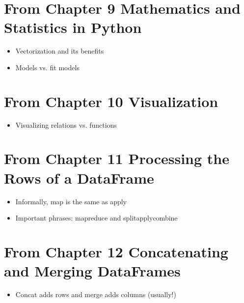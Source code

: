 \documentclass[letterpaper,10pt,english]{jupyterBook}
\begin{document}
\section{From Chapter 9 \sphinxhyphen{} Mathematics and Statistics in Python}
\label{\detokenize{bigpic-list:from-chapter-9-mathematics-and-statistics-in-python}}\begin{itemize}
\item {} 
\sphinxAtStartPar
Vectorization and its benefits

\item {} 
\sphinxAtStartPar
Models vs. fit models

\end{itemize}


\section{From Chapter 10 \sphinxhyphen{} Visualization}
\label{\detokenize{bigpic-list:from-chapter-10-visualization}}\begin{itemize}
\item {} 
\sphinxAtStartPar
Visualizing relations vs. functions

\end{itemize}


\section{From Chapter 11 \sphinxhyphen{} Processing the Rows of a DataFrame}
\label{\detokenize{bigpic-list:from-chapter-11-processing-the-rows-of-a-dataframe}}\begin{itemize}
\item {} 
\sphinxAtStartPar
Informally, map is the same as apply

\item {} 
\sphinxAtStartPar
Important phrases: map\sphinxhyphen{}reduce and split\sphinxhyphen{}apply\sphinxhyphen{}combine

\end{itemize}


\section{From Chapter 12 \sphinxhyphen{} Concatenating and Merging DataFrames}
\label{\detokenize{bigpic-list:from-chapter-12-concatenating-and-merging-dataframes}}\begin{itemize}
\item {} 
\sphinxAtStartPar
Concat adds rows and merge adds columns (usually!)

\end{itemize}
\end{document}
